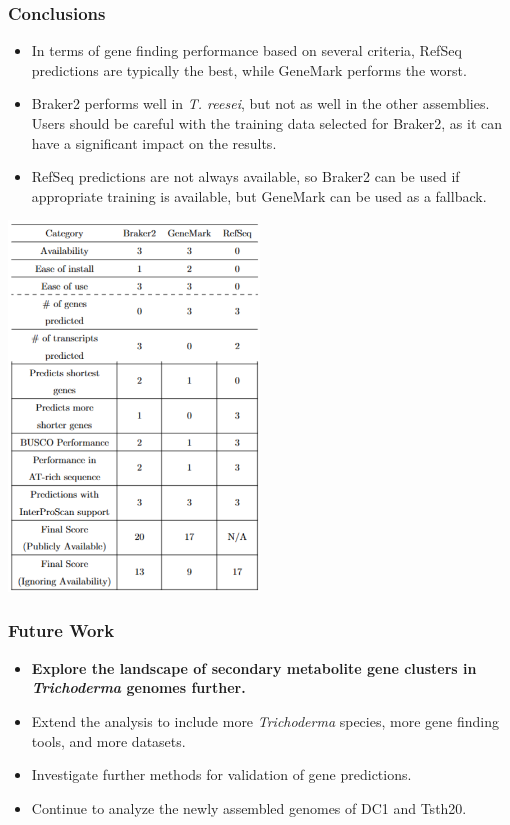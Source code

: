 \documentclass[t]{beamer}
\begin{document}
\begin{frame}
	\frametitle{Conclusions}
	\begin{itemize}
		\item In terms of gene finding performance based on several criteria, RefSeq predictions are typically the best, while GeneMark performs the worst.
		\item Braker2 performs well in \textit{T. reesei}, but not as well in the other assemblies. Users should be careful with the training data selected for Braker2, as it can have a significant impact on the results.
		\item RefSeq predictions are not always available, so Braker2 can be used if appropriate training is available, but GeneMark can be used as a fallback.
	\end{itemize}
\end{frame}

\begin{frame}
	\vspace{0.75cm}
	\centering
	\includegraphics[width=0.5\textwidth]{../../working-thesis/figures/conclusion-snip.png}
\end{frame}

\begin{frame}
	\frametitle{Future Work}
	\begin{itemize}
		\item \textbf{Explore the landscape of secondary metabolite gene clusters in \textit{Trichoderma} genomes further.}
		\item Extend the analysis to include more \textit{Trichoderma} species, more gene finding tools, and more datasets.
		\item Investigate further methods for validation of gene predictions.
		\item Continue to analyze the newly assembled genomes of DC1 and Tsth20.
	\end{itemize}
\end{frame}
\end{document}
